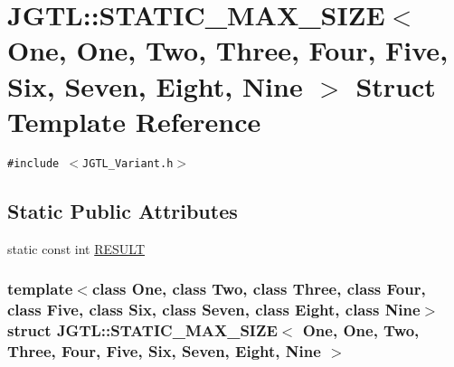 \hypertarget{struct_j_g_t_l_1_1_s_t_a_t_i_c___m_a_x___s_i_z_e_3_01_one_00_01_one_00_01_two_00_01_three_00_01_f759e6bc76a9114cc8ef25088b44cc11}{
\section{JGTL::STATIC\_\-MAX\_\-SIZE$<$ One, One, Two, Three, Four, Five, Six, Seven, Eight, Nine $>$ Struct Template Reference}
\label{struct_j_g_t_l_1_1_s_t_a_t_i_c___m_a_x___s_i_z_e_3_01_one_00_01_one_00_01_two_00_01_three_00_01_f759e6bc76a9114cc8ef25088b44cc11}
}
{\tt \#include $<$JGTL\_\-Variant.h$>$}

\subsection*{Static Public Attributes}
\begin{CompactItemize}
\item 
static const int \hyperlink{struct_j_g_t_l_1_1_s_t_a_t_i_c___m_a_x___s_i_z_e_3_01_one_00_01_one_00_01_two_00_01_three_00_01_f759e6bc76a9114cc8ef25088b44cc11_061c58e801098766aed76b8bb3ed305f}{RESULT}
\end{CompactItemize}
\subsubsection*{template$<$class One, class Two, class Three, class Four, class Five, class Six, class Seven, class Eight, class Nine$>$ struct JGTL::STATIC\_\-MAX\_\-SIZE$<$ One, One, Two, Three, Four, Five, Six, Seven, Eight, Nine $>$}



